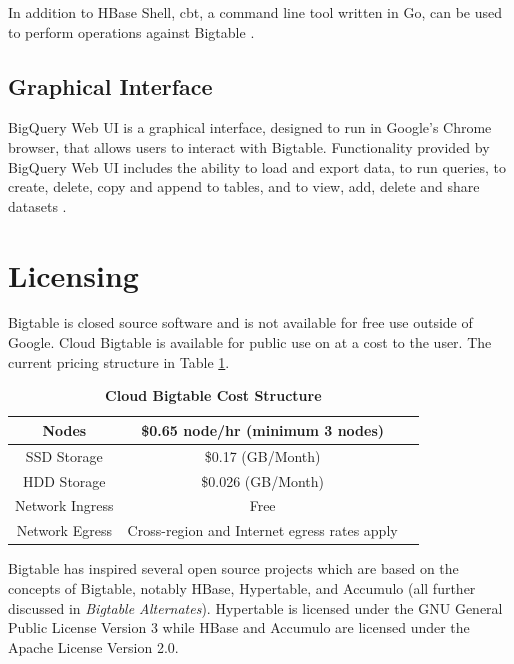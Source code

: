 \documentclass[9pt,twocolumn,twoside]{../../styles/osajnl}
\begin{document}
In addition to HBase Shell, cbt, a command line tool written in Go, can be used to perform operations against Bigtable \cite{www-cbt}. 

\subsection{Graphical Interface}

BigQuery Web UI is a graphical interface, designed to run in Google's Chrome browser, that allows users to interact with Bigtable. Functionality provided by BigQuery Web UI includes the ability to load and export data, to run queries, to create, delete, copy and append to tables, and to view, add, delete and share datasets \cite{www-bigquerywebui}.

\section{Licensing}

Bigtable is closed source software and is not available for free use outside of Google. Cloud Bigtable is available for public use on at a cost to the user. The current pricing structure in Table \ref{tab:bigtable-pricing}.

\begin{table}[htbp]
\centering
\caption{\bf Cloud Bigtable Cost Structure \cite{www-cloudbigtable}}

 \begin{tabular} {| c | c | c |}

 \hline
Nodes     &    \$0.65 node/hr (minimum 3 nodes) \\
 \hline
SSD Storage     &    \$0.17 (GB/Month)  \\
 \hline
HDD Storage & \$0.026 (GB/Month) \\
 \hline
Network Ingress & Free \\
 \hline
Network Egress & Cross-region and Internet egress rates apply \\
 \hline

\end{tabular}
  \label{tab:bigtable-pricing}
\end{table}

Bigtable has inspired several open source projects which are based on the concepts of Bigtable, notably HBase, Hypertable, and Accumulo (all further discussed in \emph{Bigtable Alternates}). Hypertable is licensed under the GNU General Public License Version 3 while HBase and Accumulo are licensed under the Apache License Version 2.0.
\end{document}
